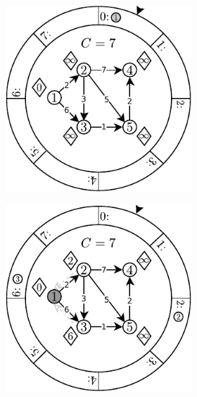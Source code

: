 \begin{figure}[!htbp]
	\centering
	\begin{subfigure}[b]{\textwidth}
		\null\hfill
		\begin{subfigure}[b]{0.3\textwidth}
			\includegraphics[width=\textwidth]{Chapter_II/DIAL-Example/a.pdf}
			\caption{}
			\label{fig:exampleDial:a}
		\end{subfigure}
		\hfill
		\begin{subfigure}[b]{0.3\textwidth}
			\includegraphics[width=\textwidth]{Chapter_II/DIAL-Example/b.pdf}

\end{subfigure}
\end{subfigure}
\end{figure}

